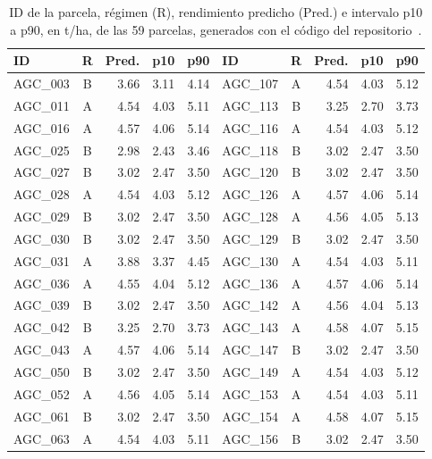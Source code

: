 \begin{table}[!t]
\centering
\caption{ID de la parcela, régimen (R), rendimiento predicho (Pred.) e intervalo p10 a p90, en t/ha, de las 59
parcelas, generados con el código del repositorio~\cite{repo}.}
\label{tab:predicciones}
\fontsize{6.5}{7.6}\selectfont
\setlength{\tabcolsep}{2.2pt}
\begin{tabular}{@{}lcrrr@{\hspace{1.2em}}lcrrr@{}}
\toprule
ID & R & Pred. & p10 & p90 & ID & R & Pred. & p10 & p90 \\
\midrule
AGC\_003 & B & 3.66 & 3.11 & 4.14 & AGC\_107 & A & 4.54 & 4.03 & 5.12 \\
AGC\_011 & A & 4.54 & 4.03 & 5.11 & AGC\_113 & B & 3.25 & 2.70 & 3.73 \\
AGC\_016 & A & 4.57 & 4.06 & 5.14 & AGC\_116 & A & 4.54 & 4.03 & 5.12 \\
AGC\_025 & B & 2.98 & 2.43 & 3.46 & AGC\_118 & B & 3.02 & 2.47 & 3.50 \\
AGC\_027 & B & 3.02 & 2.47 & 3.50 & AGC\_120 & B & 3.02 & 2.47 & 3.50 \\
AGC\_028 & A & 4.54 & 4.03 & 5.12 & AGC\_126 & A & 4.57 & 4.06 & 5.14 \\
AGC\_029 & B & 3.02 & 2.47 & 3.50 & AGC\_128 & A & 4.56 & 4.05 & 5.13 \\
AGC\_030 & B & 3.02 & 2.47 & 3.50 & AGC\_129 & B & 3.02 & 2.47 & 3.50 \\
AGC\_031 & A & 3.88 & 3.37 & 4.45 & AGC\_130 & A & 4.54 & 4.03 & 5.11 \\
AGC\_036 & A & 4.55 & 4.04 & 5.12 & AGC\_136 & A & 4.57 & 4.06 & 5.14 \\
AGC\_039 & B & 3.02 & 2.47 & 3.50 & AGC\_142 & A & 4.56 & 4.04 & 5.13 \\
AGC\_042 & B & 3.25 & 2.70 & 3.73 & AGC\_143 & A & 4.58 & 4.07 & 5.15 \\
AGC\_043 & A & 4.57 & 4.06 & 5.14 & AGC\_147 & B & 3.02 & 2.47 & 3.50 \\
AGC\_050 & B & 3.02 & 2.47 & 3.50 & AGC\_149 & A & 4.54 & 4.03 & 5.12 \\
AGC\_052 & A & 4.56 & 4.05 & 5.14 & AGC\_153 & A & 4.54 & 4.03 & 5.11 \\
AGC\_061 & B & 3.02 & 2.47 & 3.50 & AGC\_154 & A & 4.58 & 4.07 & 5.15 \\
AGC\_063 & A & 4.54 & 4.03 & 5.11 & AGC\_156 & B & 3.02 & 2.47 & 3.50 \\

\end{tabular}
\end{table}
